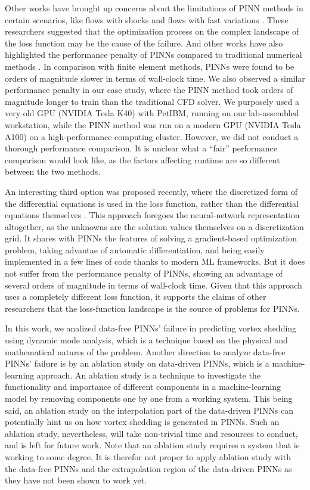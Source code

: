 Other works have brought up concerns about the limitations of PINN methods in certain scenarios, like flows with shocks \cite{fuks_limitations_2020} and flows with fast variations \cite{krishnapriyan_failure_2021}.
These researchers suggested that the optimization process on the complex landscape of the loss function may be the cause of the failure.
And other works have also highlighted the performance penalty of PINNs compared to traditional numerical methods \cite{grossmann_pinnvsfem_2023}.
In comparison with finite element methods, PINNs were found to be orders of magnitude slower in terms of wall-clock time.
We also observed a similar performance penalty in our case study, where the PINN method took orders of magnitude longer to train than the traditional CFD solver.
We purposely used a very old GPU (NVIDIA Tesla K40) with PetIBM, running on our lab-assembled workstation, while the PINN method was run on a modern GPU (NVIDIA Tesla A100) on a high-performance computing cluster.
However, we did not conduct a thorough performance comparison.
It is unclear what a ``fair'' performance comparison would look like, as the factors affecting runtime are so different between the two methods.

An interesting third option was proposed recently, where the discretized form of the differential equations is used in the loss function, rather than the differential equations themselves \cite{karnakov_odil_2022}.
This approach foregoes the neural-network representation altogether, as the unknowns are the solution values themselves on a discretization grid. 
It shares with PINNs the features of solving a gradient-based optimization problem, taking advantae of automatic differentiation, and being easily implemented in a few lines of code thanks to modern ML frameworks. 
But it does not suffer from the performance penalty of PINNs, showing an advantage of several orders of magnitude in terms of wall-clock time.
Given that this approach uses a completely different loss function, it supports the claims of other researchers that the loss-function landscape is the source of problems for PINNs.

In this work, we analized data-free PINNs' failure in predicting vortex shedding using dynamic mode analysis, which is a technique based on the physical and mathematical natures of the problem.
Another direction to analyze data-free PINNs' failure is by an ablation study on data-driven PINNs, which is a machine-learning approach.
An ablation study is a technique to investigate the functionality and importance of different components in a machine-learning model by removing components one by one from a working system.
This being said, an ablation study on the interpolation part of the data-driven PINNs can potentially hint us on how vortex shedding is generated in PINNs.
Such an ablation study, nevertheless, will take non-trivial time and resources to conduct, and is left for future work.
Note that an ablation study requires a system that is working to some degree.
It is therefor not proper to apply ablation study with the data-free PINNs and the extrapolation region of the data-driven PINNs as they have not been shown to work yet.


